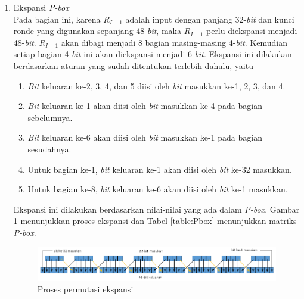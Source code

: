 \begin{enumerate}
	\item Ekspansi \textit{P-box}\\
	Pada bagian ini, karena \begin{math}R_{I-1}\end{math} adalah input dengan panjang 32-\textit{bit} dan kunci ronde yang digunakan sepanjang 48-\textit{bit}, maka \begin{math}R_{I-1}\end{math} perlu diekspansi menjadi 48-\textit{bit}. \begin{math}R_{I-1}\end{math} akan dibagi menjadi 8 bagian masing-masing 4-\textit{bit}. Kemudian setiap bagian 4-\textit{bit} ini akan diekspansi menjadi 6-\textit{bit}. Ekspansi ini dilakukan berdasarkan aturan yang sudah ditentukan terlebih dahulu, yaitu
	\begin{enumerate}
		\item \textit{Bit} keluaran ke-2, 3, 4, dan 5 diisi oleh \textit{bit} masukkan ke-1, 2, 3, dan 4.
		\item \textit{Bit} keluaran ke-1 akan diisi oleh \textit{bit} masukkan ke-4 pada bagian sebelumnya.
		\item \textit{Bit} keluaran ke-6 akan diisi oleh \textit{bit} masukkan ke-1 pada bagian sesudahnya.
		\item Untuk bagian ke-1, \textit{bit} keluaran ke-1 akan diisi oleh \textit{bit} ke-32 masukkan.
		\item Untuk bagian ke-8, \textit{bit} keluaran ke-6 akan diisi oleh \textit{bit} ke-1 masukkan.
	\end{enumerate}
	Ekspansi ini dilakukan berdasarkan nilai-nilai yang ada dalam \textit{P-box}. Gambar \ref{fig:expansi} menunjukkan proses ekspansi dan Tabel \ref{table:Pbox} menunjukkan matriks \textit{P-box}.
	
	\begin{figure}[H]
	\includegraphics[scale=0.6]{Gambar/expansion_permutation}
	\centering
	\caption{Proses permutasi ekspansi}\label{fig:expansi}
	\end{figure}


\end{enumerate}
